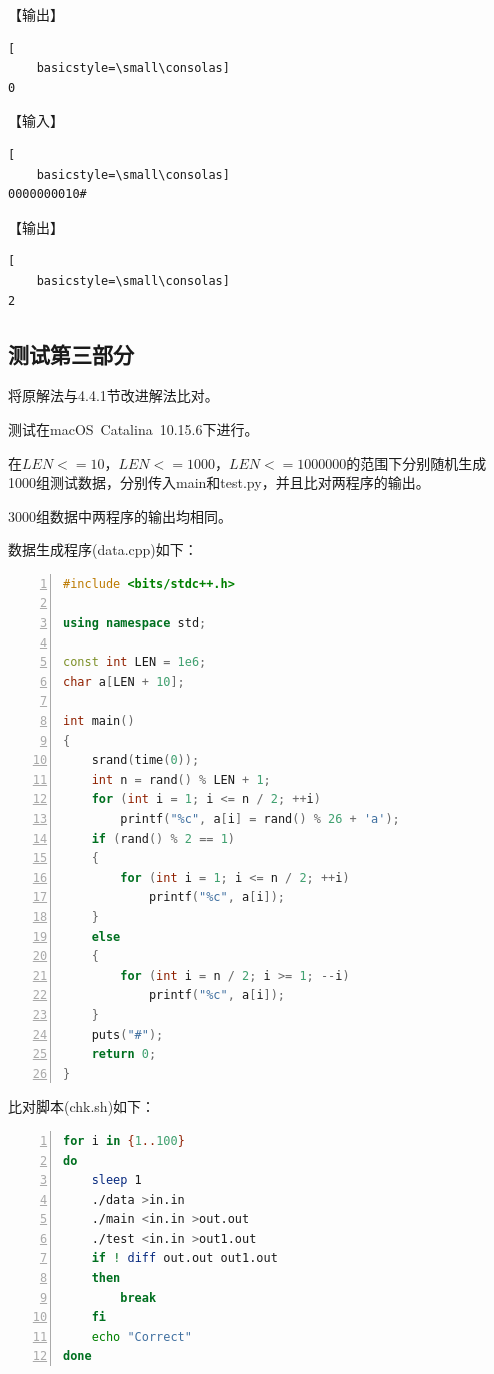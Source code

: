 \documentclass{article}
\begin{document}
【输出】

\begin{lstlisting}[
    basicstyle=\small\consolas]
0
\end{lstlisting}

【输入】

\begin{lstlisting}[
    basicstyle=\small\consolas]
0000000010#
\end{lstlisting}

【输出】

\begin{lstlisting}[
    basicstyle=\small\consolas]
2
\end{lstlisting}

\subsection{测试第三部分}

将原解法与4.4.1节改进解法比对。

测试在macOS\ Catalina\ 10.15.6下进行。

在$LEN<=10$，$LEN<=1000$，$LEN<=1000000$的范围下分别随机生成1000组测试数据，分别传入main和test.py，并且比对两程序的输出。

3000组数据中两程序的输出均相同。

数据生成程序(data.cpp)如下：

\begin{lstlisting}[language={C++},
    numbers=left,
    numberstyle=\tiny\consolas,
    basicstyle=\small\consolas]
#include <bits/stdc++.h>

using namespace std;

const int LEN = 1e6;
char a[LEN + 10];

int main()
{
    srand(time(0));
    int n = rand() % LEN + 1;
    for (int i = 1; i <= n / 2; ++i)
        printf("%c", a[i] = rand() % 26 + 'a');
    if (rand() % 2 == 1)
    {
        for (int i = 1; i <= n / 2; ++i)
            printf("%c", a[i]);
    }
    else
    {
        for (int i = n / 2; i >= 1; --i)
            printf("%c", a[i]);
    }
    puts("#");
    return 0;
}
\end{lstlisting}

比对脚本(chk.sh)如下：

\begin{lstlisting}[language={bash},
    numbers=left,
    numberstyle=\tiny\consolas,
    basicstyle=\small\consolas]
for i in {1..100}
do
    sleep 1
    ./data >in.in
    ./main <in.in >out.out
    ./test <in.in >out1.out
    if ! diff out.out out1.out
    then
        break
    fi
    echo "Correct"
done
\end{lstlisting}
\end{document}
